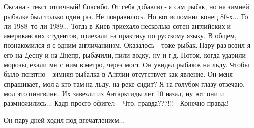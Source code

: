 \begin{itemize}
Оксана - текст отличный! Спасибо. От себя добавлю - я сам рыбак, но на зимней
рыбалке был только один раз. Не понравилось. Но вот вспомнил конец 80-х... То
ли 1988, то ли 1989... Тогда в Киев приехало несколько сотен английских и
американских студентов, приехали на практику по русскому языку. В общем,
познакомился я с одним англичанином. Оказалось - тоже рыбак. Пару раз возил я
его на Десну и на Днепр, рыбачили, пили водку, ну и т.д. Потом, когда ударили
морозы, ехали мы с ним в метро, через мост. Он увидел рыбаков на льду. Чтобы
было понятно - зимняя рыбалка в Англии отсутствует как явление. Он меня
спрашивает, мол а кто там на льду, на реке сидит? Я на голубом глазу отвечаю,
мол это пингвины. Их завезли из Антарктиды лет 10 назад, ну вот они и
размножились... Кадр просто офигел: - Что, правда???!!! - Конечно правда!

Он пару дней ходил под впечатлением...


\end{itemize} %

